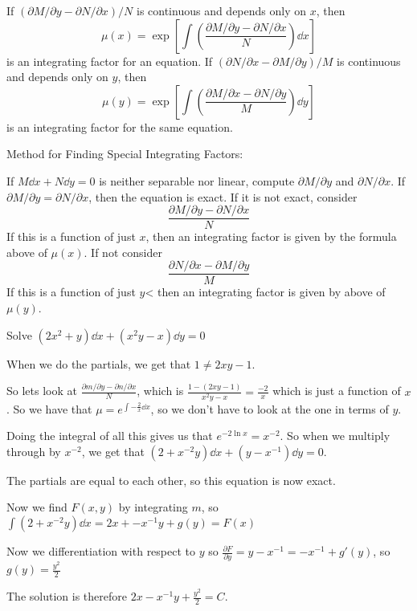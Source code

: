 \documentclass[../diffeq.tex]{subfiles}
\begin{document}
\pagebreak
\begin{theorem}
    If $(\partial M/\partial y-\partial N/\partial x)/N$ is continuous and depends only on $x$, then 
    \[ \mu(x)=\exp \left[\int \left(\frac{\partial M/\partial y-\partial N/\partial x}{N}\right)\dd x\right] \]
    is an integrating factor for an equation. If $(\partial N/\partial x - \partial M/\partial y)/M$ is continuous and depends only on $y$, then 
    \[ \mu(y)=\exp \left[\int \left(\frac{\partial M/\partial x-\partial N/\partial y}{M}\right)\dd y\right] \]
    is an integrating factor for the same equation.
\end{theorem}

Method for Finding Special Integrating Factors:

If $M\dd x + N\dd y = 0$ is neither separable nor linear, compute $\partial M/\partial y$ and $\partial N/\partial x$. If $\partial M/\partial y = \partial N/\partial x$, then the equation is exact. If it is not exact, consider 
\[ \frac{\partial M/\partial y-\partial N/\partial x}{N}\]
If this is a function of just $x$, then an integrating factor is given by the formula above of $\mu(x)$. If not consider 
\[ \frac{\partial N/\partial x - \partial M/\partial y}{M} \]
If this is a function of just $y$< then an integrating factor is given by above of $\mu(y)$.

\begin{example}
    Solve $(2x^2+y)\dd x + (x^2y-x)\dd y = 0$

    When we do the partials, we get that $1\neq 2xy-1$.

    So lets look at $\frac{\partial m/\partial y - \partial n/\partial x}{N}$, which is $\frac{1-(2xy-1)}{x^2y-x} = \frac{-2}{x}$ which is just a function of $x$. So we have that $\mu = e^{\int -\frac{2}{x}\dd x}$, so we don't have to look at the one in terms of $y$.

    Doing the integral of all this gives us that $e^{-2\ln x} = x^{-2}$. So when we multiply through by $x^{-2}$, we get that $(2+x^{-2}y) \dd x + (y-x^{-1})\dd y =0$.

    The partials are equal to each other, so this equation is now exact.

    Now we find $F(x,y)$ by integrating $m$, so $\int (2+x^{-2}y)\dd x = 2x+-x^{-1}y+g(y)=F(x)$

    Now we differentiation with respect to $y$ so $\frac{\partial F}{\partial y}=y-x^{-1}=-x^{-1}+g'(y)$, so $g(y)=\frac{y^2}{2}$

    The solution is therefore $2x-x^{-1}y+\frac{y^2}{2}=C$.
\end{example}
\end{document}
